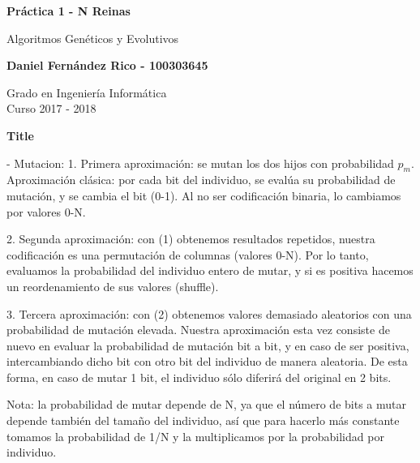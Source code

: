 \documentclass[12pt]{article}
\begin{document}
  \begin{titlepage}
    \begin{center}
        \vspace*{1cm}
        
        \Huge
        \textbf{Práctica 1 - N Reinas}

        \vspace{0.5cm}

        \huge
        Algoritmos Genéticos y Evolutivos
        
        
        \vspace{1.5cm}
        
        \large
        \textbf{Daniel Fernández Rico - 100303645}
        
        \large
        Grado en Ingeniería Informática\\
        Curso 2017 - 2018\\

    \end{center}
  \end{titlepage}

  \begin{center}
    \Large
    \textbf{Title}
    
    \vspace{0.4cm}
    
  \end{center}

  - Mutacion:
  1. Primera aproximación: se mutan los dos hijos con probabilidad $p_m$. Aproximación clásica: por cada bit del individuo, se evalúa su probabilidad de mutación, y se cambia el bit (0-1). Al no ser codificación binaria, lo cambiamos por valores 0-N.

  2. Segunda aproximación: con (1) obtenemos resultados repetidos, nuestra codificación es una permutación de columnas (valores 0-N). Por lo tanto, evaluamos la probabilidad del individuo entero de mutar, y si es positiva hacemos un reordenamiento de sus valores (shuffle).

  3. Tercera aproximación: con (2) obtenemos valores demasiado aleatorios con una probabilidad de mutación elevada. Nuestra aproximación esta vez consiste de nuevo en evaluar la probabilidad de mutación bit a bit, y en caso de ser positiva, intercambiando dicho bit con otro bit del individuo de manera aleatoria. De esta forma, en caso de mutar 1 bit, el individuo sólo diferirá del original en 2 bits.

  Nota: la probabilidad de mutar depende de N, ya que el número de bits a mutar depende también del tamaño del individuo, así que para hacerlo más constante tomamos la probabilidad de 1/N y la multiplicamos por la probabilidad por individuo.
\end{document}
